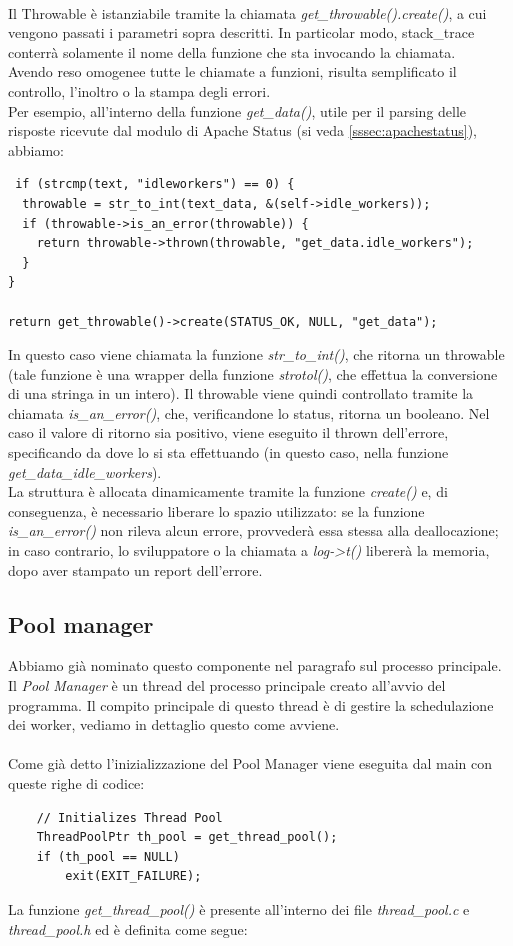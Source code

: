 \documentclass[italian]{tktltiki2}
\begin{document}
\\
Il Throwable è istanziabile tramite la chiamata \emph{get\_throwable().create()}, a cui vengono passati i parametri sopra descritti. In particolar modo, stack\_trace conterrà solamente il nome della funzione che sta invocando la chiamata.
\\
Avendo reso omogenee tutte le chiamate a funzioni, risulta semplificato il controllo, l'inoltro o la stampa degli errori.
\\
Per esempio, all'interno della funzione \emph{get\_data()}, utile per il parsing delle risposte ricevute dal modulo di Apache Status (si veda \ref{sssec:apachestatus}), abbiamo:

\begin{lstlisting}
 if (strcmp(text, "idleworkers") == 0) {
  throwable = str_to_int(text_data, &(self->idle_workers));
  if (throwable->is_an_error(throwable)) {
    return throwable->thrown(throwable, "get_data.idle_workers");
  }
}

return get_throwable()->create(STATUS_OK, NULL, "get_data");
\end{lstlisting}
In questo caso viene chiamata la funzione \emph{str\_to\_int()}, che ritorna un throwable (tale funzione è una wrapper della funzione \emph{strotol()}, che effettua la conversione di una stringa in un intero). Il throwable viene quindi controllato tramite la chiamata \emph{is\_an\_error()}, che, verificandone lo status, ritorna un booleano. Nel caso il valore di ritorno sia positivo, viene eseguito il thrown dell'errore, specificando da dove lo si sta effettuando (in questo caso, nella funzione \emph{get\_data\_idle\_workers}).
\\
La struttura è allocata dinamicamente tramite la funzione \emph{create()} e, di conseguenza, è necessario liberare lo spazio utilizzato: se la funzione \emph{is\_an\_error()} non rileva alcun errore, provvederà essa stessa alla deallocazione; in caso contrario, lo sviluppatore o la chiamata a \emph{log->t()} libererà la memoria, dopo aver stampato un report dell'errore.

\subsection{Pool manager}
\label{ssec:pool}

Abbiamo già nominato questo componente nel paragrafo sul processo principale. Il \emph{Pool Manager} è un thread del processo principale creato all'avvio del programma. Il compito principale di questo thread è di gestire la schedulazione dei worker, vediamo in dettaglio questo come avviene.\\\\ Come già detto l'inizializzazione del Pool Manager viene eseguita dal main con queste righe di codice:
\begin{lstlisting}
    // Initializes Thread Pool
    ThreadPoolPtr th_pool = get_thread_pool();
    if (th_pool == NULL)
        exit(EXIT_FAILURE);
\end{lstlisting}
La funzione \emph{get\_thread\_pool()} è presente all'interno dei file \emph{thread\_pool.c} e \emph{thread\_pool.h} ed è definita come segue:
\end{document}
